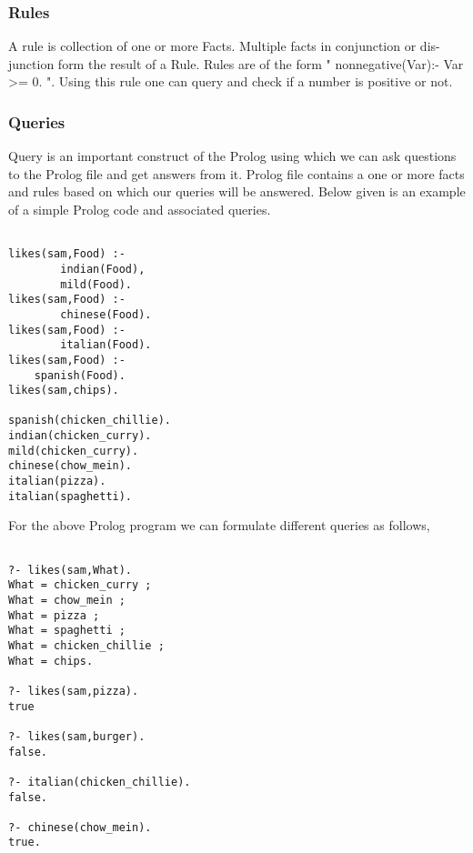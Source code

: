 \subsubsection{Rules}
A rule is collection of one or more Facts. Multiple facts in conjunction or dis-junction form the result of a Rule. Rules are of the form " nonnegative(Var):- Var >= 0. ". Using this rule one can query and check if a number is positive or not.

\subsubsection{Queries}
Query is an important construct of the Prolog using which we can ask questions to the Prolog file and get answers from it. Prolog  file contains a one or more facts and rules based on which our queries will be answered. \linebreak
Below given is an example of a simple Prolog code and associated queries.

\begin{minipage}{\linewidth}
\lstset{caption=Prolog Queries, captionpos=b, breaklines=true}       
\begin{lstlisting}[frame=single]

likes(sam,Food) :-
        indian(Food),
        mild(Food).
likes(sam,Food) :-
        chinese(Food).
likes(sam,Food) :-
        italian(Food).
likes(sam,Food) :-
	spanish(Food).
likes(sam,chips).

spanish(chicken_chillie).
indian(chicken_curry).
mild(chicken_curry).
chinese(chow_mein).
italian(pizza).
italian(spaghetti).

\end{lstlisting}
\end{minipage} 

For the above Prolog program we can formulate different queries as follows,

\begin{minipage}{\linewidth}
\lstset{caption=Prolog example, captionpos=b, breaklines=true}       
\begin{lstlisting}[frame=single]

?- likes(sam,What).
What = chicken_curry ;
What = chow_mein ;
What = pizza ;
What = spaghetti ;
What = chicken_chillie ;
What = chips.

?- likes(sam,pizza).
true

?- likes(sam,burger).
false.

?- italian(chicken_chillie).
false.

?- chinese(chow_mein).
true.

\end{lstlisting}
\end{minipage}

